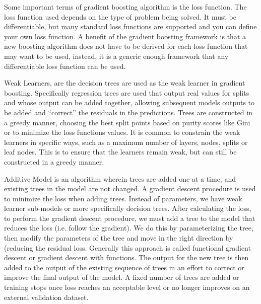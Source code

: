 \documentclass[12pt]{article}
\begin{document}
Some important terms of gradient boosting algorithm is the loss function. The loss function used depends on the type of problem being solved. It must be differentiable, but many standard loss functions are supported and you can define your own loss function. A benefit of the gradient boosting framework is that a new boosting algorithm does not have to be derived for each loss function that may want to be used, instead, it is a generic enough framework that any differentiable loss function can be used.

Weak Learners, are the decision trees are used as the weak learner in gradient boosting. Specifically regression trees are used that output real values for splits and whose output can be added together, allowing subsequent models outputs to be added and “correct” the residuals in the predictions. Trees are constructed in a greedy manner, choosing the best split points based on purity scores like Gini or to minimize the loss functions values. It is common to constrain the weak learners in specific ways, such as a maximum number of layers, nodes, splits or leaf nodes. This is to ensure that the learners remain weak, but can still be constructed in a greedy manner.

Additive Model is an algorithm wherein trees are added one at a time, and existing trees in the model are not changed. A gradient descent procedure is used to minimize the loss when adding trees.  Instead of parameters, we have weak learner sub-models or more specifically decision trees. After calculating the loss, to perform the gradient descent procedure, we must add a tree to the model that reduces the loss (i.e. follow the gradient). We do this by parameterizing the tree, then modify the parameters of the tree and move in the right direction by (reducing the residual loss. Generally this approach is called functional gradient descent or gradient descent with functions. The output for the new tree is then added to the output of the existing sequence of trees in an effort to correct or improve the final output of the model. A fixed number of trees are added or training stops once loss reaches an acceptable level or no longer improves on an external validation dataset.
\end{document}
